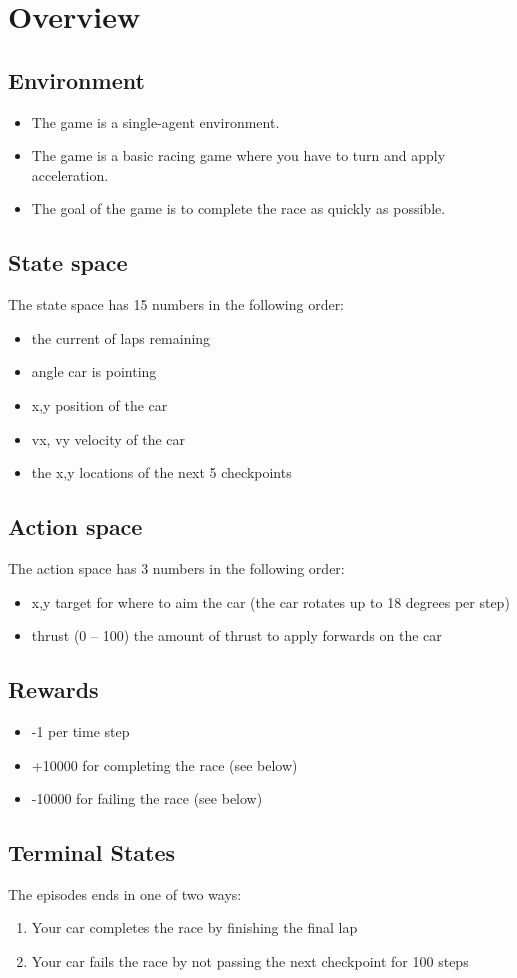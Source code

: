 \documentclass[11pt]{article}
\author{Kevin James}
\date{\today}
\title{}
\begin{document}
\section{Overview}
\label{sec:org0975d0e}
\subsection{Environment}
\label{sec:org921e6f7}
\begin{itemize}
\item The game is a single-agent environment.
\item The game is a basic racing game where you have to turn and apply acceleration.
\item The goal of the game is to complete the race as quickly as possible.
\end{itemize}
\subsection{State space}
\label{sec:org14b6ef7}
The state space has 15 numbers in the following order:
\begin{itemize}
\item the current of laps remaining
\item angle car is pointing
\item x,y position of the car
\item vx, vy velocity of the car
\item the x,y locations of the next 5 checkpoints
\end{itemize}
\subsection{Action space}
\label{sec:orge959863}
The action space has 3 numbers in the following order:
\begin{itemize}
\item x,y target for where to aim the car (the car rotates up to 18 degrees per step)
\item thrust (0 -- 100) the amount of thrust to apply forwards on the car
\end{itemize}
\subsection{Rewards}
\label{sec:org5aefeb4}
\begin{itemize}
\item -1 per time step
\item +10000 for completing the race (see below)
\item -10000 for failing the race (see below)
\end{itemize}
\subsection{Terminal States}
\label{sec:org1aa68a0}
The episodes ends in one of two ways:
\begin{enumerate}
\item Your car completes the race by finishing the final lap
\item Your car fails the race by not passing the next checkpoint for 100 steps
\end{enumerate}
\end{document}
